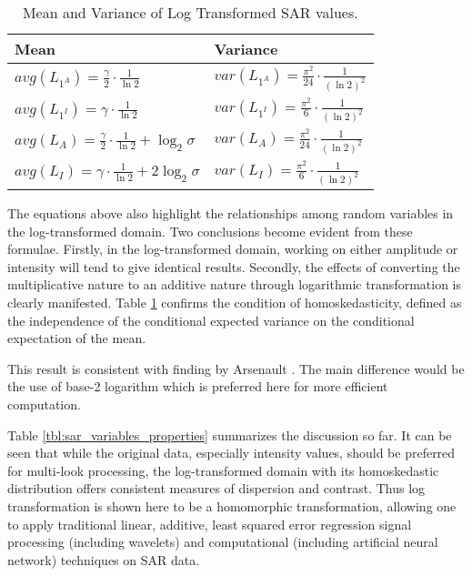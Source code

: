 \documentclass[journal]{IEEEtran}
\begin{document}
\begin{table}[!h]
\caption{ Mean and Variance of Log Transformed SAR values. }
\label{tbl:sar_log_domain_avg_var}
\normalsize
\centering

\begin{tabular}{|l|l|}
\hline
Mean & Variance \\
\hline
$avg(L_{1^A}) = \frac{ \gamma }{2} \cdot \frac{1}{\ln2}$ & $var(L_{1^A}) = \frac{ \pi ^2}{24} \cdot \frac{1}{(\ln2)^2}$ \\
$avg(L_{1^I}) = \gamma \cdot \frac{1}{\ln2} $ & $var(L_{1^I}) = \frac{ \pi ^2}{6} \cdot \frac{1}{(\ln2)^2} $ \\
$avg(L_A) = \frac{ \gamma }{2} \cdot \frac{1}{\ln2} + \log_2{\sigma}$ & $var(L_A) = \frac{ \pi ^2}{24} \cdot \frac{1}{(\ln2)^2}$ \\
$avg(L_I) = \gamma \cdot \frac{1}{\ln2} + 2 \log_2{\sigma}  $ & $ var(L_I) = \frac{ \pi ^2}{6} \cdot \frac{1}{(\ln2)^2}$ \\
\hline
\end{tabular}

\end{table}

The equations above also highlight the relationships among random variables in the log-transformed domain. 
Two conclusions become evident from these formulae. 
Firstly, in the log-transformed domain, working on either amplitude or intensity will tend to give identical results. 
Secondly, the effects of converting the multiplicative nature to an additive nature through logarithmic transformation
is clearly manifested. 
Table \ref{tbl:sar_log_domain_avg_var} confirms the condition of homoskedasticity,  
defined as the independence of the conditional expected variance on the conditional expectation of the mean. 

This result is consistent with finding by Arsenault \cite{Arsenault_JOptSocAm_1976}. 
The main difference would be the use of base-2 logarithm which is preferred here for more efficient computation. 

Table \ref{tbl:sar_variables_properties} summarizes the discussion so far. 
It can be seen that while the original data, especially intensity values, should be preferred for 
multi-look processing, the log-transformed domain with its homoskedastic distribution offers consistent measures of 
dispersion and contrast. 
Thus log transformation is shown here to be a homomorphic transformation, allowing one to apply traditional linear, 
additive, least squared error regression signal processing (including wavelets) and computational 
(including artificial neural network) techniques on SAR data.
\end{document}
